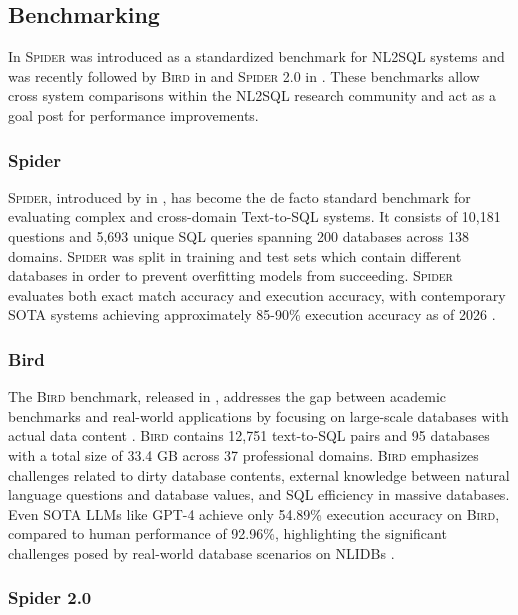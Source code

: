 \subsection{Benchmarking}

In \citeyear{Spider} \textsc{Spider} was introduced as a standardized benchmark
for NL2SQL systems and was recently followed by \textsc{Bird} in
\citeyear{BIRD} and \textsc{Spider 2.0} in \citeyear{Spider2}. These benchmarks
allow cross system comparisons within the NL2SQL research community and act as
a goal post for performance improvements.

\subsubsection{Spider}\label{lit:benchmarks:spider}

\textsc{Spider}, introduced by \citeauthor{Spider} in \citeyear{Spider}, has
become the de facto standard benchmark for evaluating complex and cross-domain
Text-to-SQL systems. It consists of 10,181 questions and 5,693 unique SQL
queries spanning 200 databases across 138 domains. \textsc{Spider}
was split in training and test sets which contain different databases in order
to prevent overfitting models from succeeding. \textsc{Spider} evaluates both
exact match accuracy and execution accuracy, with contemporary SOTA systems
achieving approximately 85-90\% execution accuracy as of 2026 \citep{Spider,
OmniSQL, XiYan, CHASE}.

\subsubsection{Bird}\label{lit:benchmarks:bird}

The \textsc{Bird} benchmark, released in \citeyear{BIRD}, addresses the gap between
academic benchmarks and real-world applications by focusing on large-scale
databases with actual data content \citep{BIRD}. \textsc{Bird} contains 12,751
text-to-SQL pairs and 95 databases with a total size of 33.4 GB across 37
professional domains. \textsc{Bird} emphasizes challenges related to dirty
database contents, external knowledge between natural language questions and
database values, and SQL efficiency in massive databases. Even SOTA LLMs like
GPT-4 achieve only 54.89\% execution accuracy on \textsc{Bird}, compared to
human performance of 92.96\%, highlighting the significant challenges posed by
real-world database scenarios on NLIDBs \citep{BIRD}.

\subsubsection{Spider 2.0}\label{lit:benchmarks:spider2}

